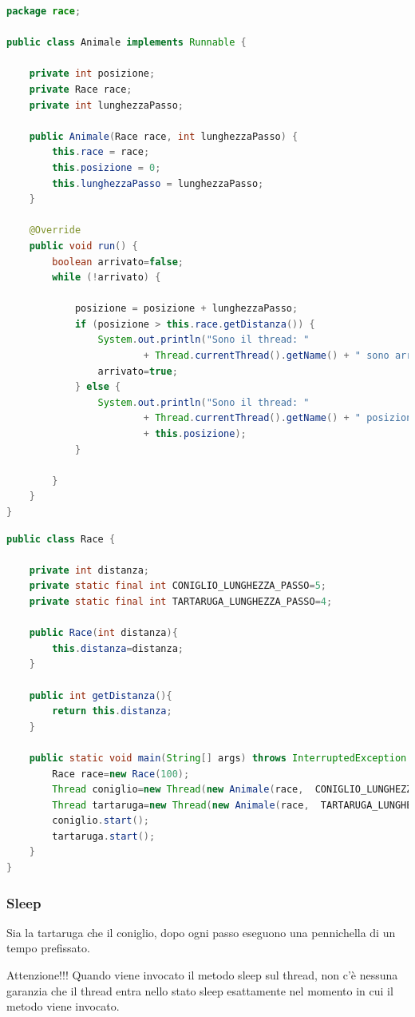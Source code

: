 \documentclass{article}
\begin{document}
\begin{lstlisting}[language=Java]
package race;

public class Animale implements Runnable {

	private int posizione;
	private Race race;
	private int lunghezzaPasso;

	public Animale(Race race, int lunghezzaPasso) {
		this.race = race;
		this.posizione = 0;
		this.lunghezzaPasso = lunghezzaPasso;
	}

	@Override
	public void run() {
		boolean arrivato=false;
		while (!arrivato) {

			posizione = posizione + lunghezzaPasso;
			if (posizione > this.race.getDistanza()) {
				System.out.println("Sono il thread: "
						+ Thread.currentThread().getName() + " sono arrivato");
				arrivato=true;
			} else {
				System.out.println("Sono il thread: "
						+ Thread.currentThread().getName() + " posizione "
						+ this.posizione);
			}

		}
	}
}
\end{lstlisting}

\begin{lstlisting}[language=Java]
public class Race {
	
	private int distanza;
	private static final int CONIGLIO_LUNGHEZZA_PASSO=5;
	private static final int TARTARUGA_LUNGHEZZA_PASSO=4;
	
	public Race(int distanza){
		this.distanza=distanza;
	}
	
	public int getDistanza(){
		return this.distanza;
	}
	
	public static void main(String[] args) throws InterruptedException {
		Race race=new Race(100);
		Thread coniglio=new Thread(new Animale(race,  CONIGLIO_LUNGHEZZA_PASSO), "CONIGLIO");
		Thread tartaruga=new Thread(new Animale(race,  TARTARUGA_LUNGHEZZA_PASSO), "TARTARUGA");
		coniglio.start();
		tartaruga.start();
	}
}
\end{lstlisting}


\subsubsection{Sleep}
\begin{framed}
Sia la tartaruga che il coniglio, dopo ogni passo eseguono una pennichella di un tempo prefissato.
\end{framed}
Attenzione!!! Quando viene invocato il metodo sleep sul thread, non c'\`e nessuna garanzia che il thread entra nello stato sleep esattamente nel momento in cui il metodo viene invocato.
\end{document}
